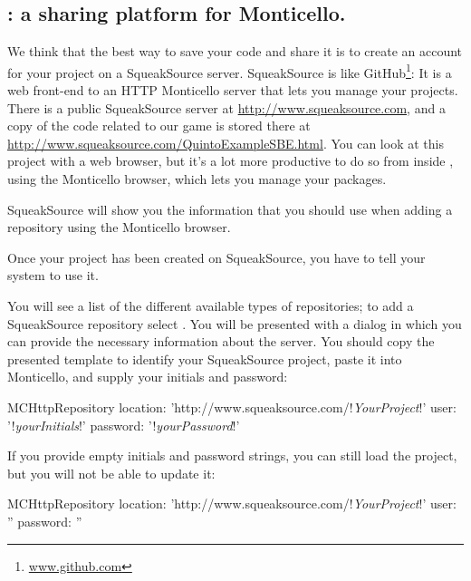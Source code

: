 \documentclass[a4paper,10pt,twoside]{book}
\begin{document}

\subsection{: a sharing platform for Monticello.}
We think that the best way to save your code and share it is to create an account for your project on a SqueakSource server.
SqueakSource is like GitHub\footnote{\url{www.github.com}}:
It is a web front-end to an HTTP Monticello server that lets you manage your projects.
There is a public SqueakSource server at \url{http://www.squeaksource.com}, and a copy of the code related to our game is stored there at \url{http://www.squeaksource.com/QuintoExampleSBE.html}.
You can look at this project with a web browser, but it's a lot more productive to do so from inside \squeak, using the Monticello browser, which lets you manage your packages.

SqueakSource will show you the information that you should use when adding a repository using the Monticello browser.

Once your project has been created on SqueakSource, you have to tell your \squeak system to use it.

You will see a list of the different available types of repositories; to add a SqueakSource repository select .
You will be presented with a dialog in which you can provide the necessary information about the server.
You should copy the presented template to identify your SqueakSource project, paste it into Monticello, and supply your initials and password:

\begin{code}{}
MCHttpRepository
    location: 'http://www.squeaksource.com/!\emph{YourProject}!'
    user: '!\emph{yourInitials}!'
    password: '!\emph{yourPassword}!'
\end{code}

\noindent
If you provide empty initials and password strings, you can still load the project, but you will not be able to update it:

\begin{code}{}
MCHttpRepository
    location: 'http://www.squeaksource.com/!\emph{YourProject}!'
    user: ''
    password: ''
\end{code}
\end{document}
